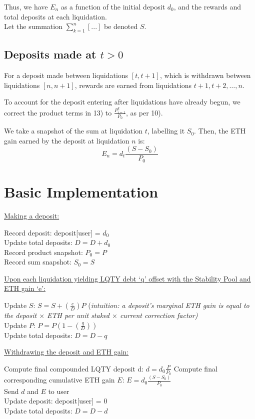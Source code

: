 \documentclass[reqno]{article}
\begin{document}
\bigskip
Thus, we have $E_n$ as a function of the initial deposit $d_0$, and the rewards and total deposits at
each liquidation.\\
Let the summation $\displaystyle\sum^n_{k=1}[...]$ be denoted  {$S$}.

\bigskip
\subsection{Deposits made at $t>0$}

\bigskip
For a deposit made between liquidations $[t, t+1]$, which is withdrawn between liquidations $[n, n
+1]$, rewards are earned from liquidations $t+1, t+2, \ldots, n$.

\bigskip
To account for the deposit entering after liquidations have already begun, we correct the product
terms in 13) to $\frac{P^k_{i = 1}}{P_0}$, as per 10).

\bigskip
We take a snapshot of the sum at liquidation $t$, labelling it {$S_0$}. Then, the ETH gain earned by the deposit at liquidation $n$ is:
\begin{equation} 
E_n=d_t\frac{(S-S_0)}{P_0}
\end{equation}

\bigskip
\section{Basic Implementation}
\underline{Making a deposit:}

Record deposit: deposit[user] = {$d_0$}\\
Update total deposits: {$D = D + d_0$}\\
Record product snapshot: {$P_0 = P$}\\
Record sum snapshot: {$S_0 = S$}

\bigskip
\underline{Upon each liquidation yielding LQTY debt ‘q’ offset with the Stability Pool and ETH gain ‘e’:}

Update $S$: {$S = S + (\frac{e}{D})P$} (\textit{intuition: a deposit’s marginal ETH gain is equal to the deposit $\times$ ETH per unit staked $\times$ current correction factor)}\\
Update $P$: {$P = P(1- (\frac{q}{D}))$}\\
Update total deposits: {$D = D - q$}

\bigskip
\underline{Withdrawing the deposit and ETH gain:}

Compute final compounded LQTY deposit d: {$d = d_0\frac{P}{P_0}$}
Compute final corresponding cumulative ETH gain $E$: {$E = d_0\frac{(S - S_0)}{P_0}$}\\
Send {$d$} and {$E$} to user\\
Update deposit: deposit[user] = 0\\
Update total deposits: {$D = D - d$}\\
\end{document}
